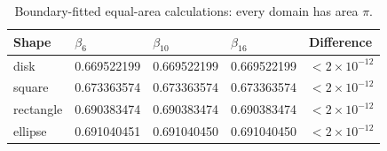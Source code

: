 \begin{table}[htbp]
\centering
\caption{Boundary-fitted equal-area calculations: every domain has area $\pi$.}
\label{tab:shapes}
\begin{tabular}{lllll}
\toprule
Shape & $\beta_6$ & $\beta_{10}$ & $\beta_{16}$ & Difference \\
\midrule
disk & 0.669522199 & 0.669522199 & 0.669522199 & $<2\times10^{-12}$ \\
square & 0.673363574 & 0.673363574 & 0.673363574 & $<2\times10^{-12}$ \\
rectangle & 0.690383474 & 0.690383474 & 0.690383474 & $<2\times10^{-12}$ \\
ellipse & 0.691040451 & 0.691040450 & 0.691040450 & $<2\times10^{-12}$ \\
\bottomrule
\end{tabular}
\end{table}
